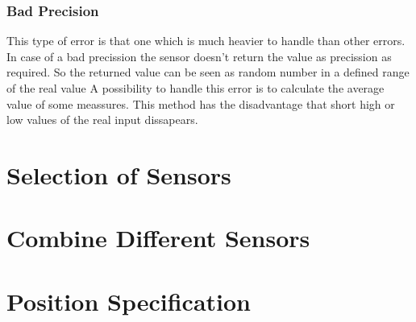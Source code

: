 \subsubsection{Bad Precision}
This type of error is that one which is much heavier to handle than other errors.
In case of a bad precission the sensor doesn't return the value as precission as required.
So the returned value can be seen as random number in a defined range of the real value
A possibility to handle this error is to calculate the average value of some meassures.
This method has the disadvantage that short high or low values of the real input dissapears.


\section{Selection of Sensors}



\section{Combine Different Sensors}


\section{Position Specification}
